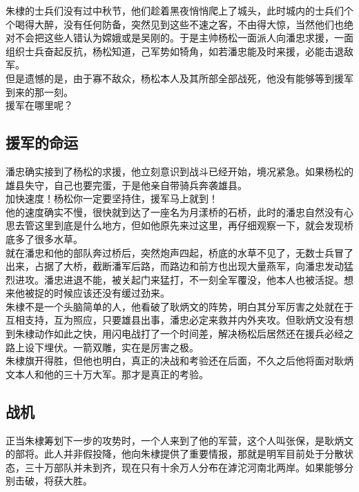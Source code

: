 \begin{multicols}{\theparacolNo}
朱棣的士兵们没有过中秋节，他们趁着黑夜悄悄爬上了城头，此时城内的士兵们个个喝得大醉，没有任何防备，突然见到这些不速之客，不由得大惊，当然他们也绝对不会把这些人错认为嫦娥或是吴刚的。于是主帅杨松一面派人向潘忠求援，一面组织士兵奋起反抗，杨松知道，己军势如犄角，如若潘忠能及时来援，必能击退敌军。\\

但是遗憾的是，由于寡不敌众，杨松本人及其所部全部战死，他没有能够等到援军到来的那一刻。\\

援军在哪里呢？\\

\subsection{援军的命运}
潘忠确实接到了杨松的求援，他立刻意识到战斗已经开始，境况紧急。如果杨松的雄县失守，自己也要完蛋，于是他亲自带骑兵奔袭雄县。\\

加快速度！杨松你一定要坚持住，援军马上就到！\\

他的速度确实不慢，很快就到达了一座名为月漾桥的石桥，此时的潘忠自然没有心思去管这里到底是什么地方，但如他原先来过这里，再仔细观察一下，就会发现桥底多了很多水草。\\

就在潘忠和他的部队奔过桥后，突然炮声四起，桥底的水草不见了，无数士兵冒了出来，占据了大桥，截断潘军后路，而路边和前方也出现大量燕军，向潘忠发动猛烈进攻。潘忠进退不能，被关起门来猛打，不一刻全军覆没，他本人也被活捉。想来他被捉的时候应该还没有缓过劲来。\\

朱棣不是一个头脑简单的人，他看破了耿炳文的阵势，明白其分军厉害之处就在于互相支持，互为照应，只要雄县出事，潘忠必定来救并内外夹攻。但耿炳文没有想到朱棣动作如此之快，用闪电战打了一个时间差，解决杨松后居然还在援兵必经之路上设下埋伏。一箭双雕，实在是厉害之极。\\

朱棣旗开得胜，但他也明白，真正的决战和考验还在后面，不久之后他将面对耿炳文本人和他的三十万大军。那才是真正的考验。\\

\subsection{战机}
正当朱棣筹划下一步的攻势时，一个人来到了他的军营，这个人叫张保，是耿炳文的部将。此人并非假投降，他向朱棣提供了重要情报，那就是明军目前处于分散状态，三十万部队并未到齐，现在只有十余万人分布在滹沱河南北两岸。如果能够分别击破，将获大胜。\\


\end{multicols}
